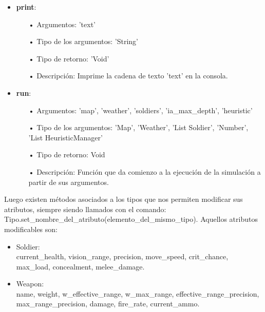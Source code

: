 \documentclass[twoside]{article}
\begin{document}
\begin{itemize}
			\item \textbf{print}:\\
			\begin{itemize}
				\item[•] Argumentos: 'text' \\
				\item[•] Tipo de los argumentos: 'String'\\ 
				\item[•] Tipo de retorno: 'Void'\\
				\item[•] Descripci\'on: Imprime la cadena de texto 'text' en la consola.
			\end{itemize}\vspace{0.2cm}
			
			\item \textbf{run}:\\
			\begin{itemize}
				\item[•] Argumentos: 'map', 'weather', 'soldiers', 'ia\_max\_depth', 'heuristic'\\
				\item[•] Tipo de los argumentos: 'Map', 'Weather', 'List Soldier', 'Number', 'List HeuristicManager'\\ 
				\item[•] Tipo de retorno: Void\\
				\item[•] Descripci\'on: Funci\'on que da comienzo a la ejecuci\'on de la simulaci\'on a partir de sus argumentos.
			\end{itemize} \vspace{0.2cm}
			
		\end{itemize}
		
		Luego existen m\'etodos asociados a los tipos que nos permiten modificar sus atributos, siempre siendo llamados con el comando: Tipo.set\_nombre\_del\_atributo(elemento\_del\_mismo\_tipo). Aquellos atributos modificables son:
		
		\begin{itemize}
			\item Soldier:\\
			current\_health, vision\_range, precision, move\_speed, crit\_chance,  max\_load, concealment, melee\_damage.\\
			
			\item Weapon: \\
			name, weight, w\_effective\_range, w\_max\_range, effective\_range\_precision, max\_range\_precision, damage, fire\_rate, current\_ammo.
		\end{itemize}
		
		
\end{document}
